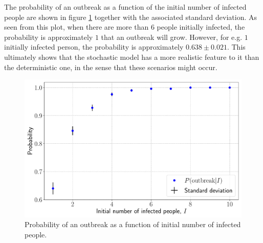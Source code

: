 The probability of an outbreak as a function of the initial number of infected people are shown in figure \ref{fig:prob_outbreak} together with the associated standard deviation. As seen from this plot, when there are more than $6$ people initially infected, the probability is approximately $1$ that an outbreak will grow. However, for e.g. $1$ initially infected person, the probability is approximately $0.638 \pm 0.021$. This ultimately shows that the stochastic model has a more realistic feature to it than the deterministic one, in the sense that these scenarios might occur.

\begin{figure}[htb]
	\centering
	\includegraphics[width=0.8\columnwidth]{../fig/2Bc_prob.pdf}
	\caption{Probability of an outbreak as a function of initial number of infected people.}
	\label{fig:prob_outbreak}
\end{figure}

\clearpage